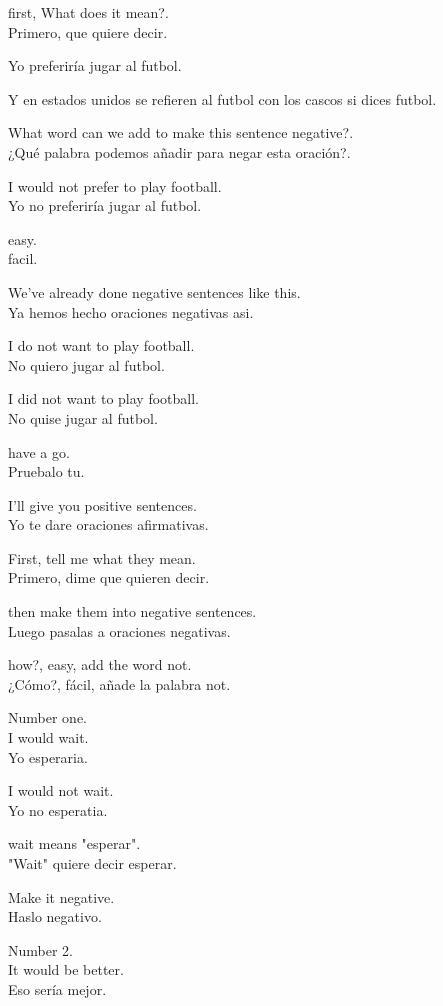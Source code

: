 first, What does it mean?.\\
Primero, que quiere decir.

Yo preferiría jugar al futbol.

Y en estados unidos se refieren al
futbol con los cascos si dices futbol.

What word can we add to make this sentence negative?.\\
¿Qué palabra podemos añadir para negar esta oración?.

I would not prefer to play football.\\
Yo no preferiría jugar al futbol.

easy.\\
facil.

We've already done negative sentences like this.\\
Ya hemos hecho oraciones negativas asi.

I do not want to play football.\\
No quiero jugar al futbol.

I did not want to play football.\\
No quise jugar al futbol.

have a go.\\
Pruebalo tu.

I'll give you positive sentences.\\
Yo te dare oraciones afirmativas.

First, tell me what they mean.\\
Primero, dime que quieren decir.

then make them into negative sentences.\\
Luego pasalas a oraciones negativas.

how?, easy, add the word not.\\
¿Cómo?, fácil, añade la palabra not.

Number one.\\

I would wait.\\
Yo esperaria.

I would not wait.\\
Yo no esperatia.

wait means "esperar".\\
"Wait" quiere decir esperar.

Make it negative.\\
Haslo negativo.

Number 2.\\
It would be better.\\
Eso sería mejor.

